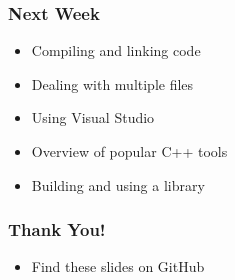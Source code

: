 \documentclass[glossy]{beamer}
\begin{document}
\begin{frame}[fragile=singleslide]
  \frametitle{Next Week}
  \begin{itemize}
    \item Compiling and linking code
    \item Dealing with multiple files
    \item Using Visual Studio
    \item Overview of popular C++ tools
    \item Building and using a library
  \end{itemize}
\end{frame}

\begin{frame}[fragile=singleslide]
  \frametitle{Thank You!}
  \begin{itemize}
    \item Find these slides on GitHub
  \end{itemize}
\end{frame}
\end{document}
